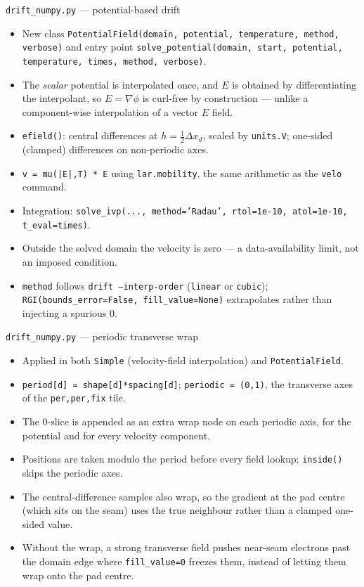 \documentclass[10pt,aspectratio=169]{beamer}
\newcommand{\ti}[1]{\texttt{\footnotesize #1}}
\begin{document}
\begin{frame}[allowframebreaks]{\texttt{drift\_numpy.py} --- potential-based drift}
  \begin{itemize}\small
  \item New class \ti{PotentialField(domain, potential, temperature, method, verbose)} and
        entry point \ti{solve\_potential(domain, start, potential, temperature, times,
        method, verbose)}.
  \item The \emph{scalar} potential is interpolated once, and $E$ is obtained by
        differentiating the interpolant, so $E=\nabla\phi$ is curl-free by construction ---
        unlike a component-wise interpolation of a vector $E$ field.
  \item \ti{efield()}: central differences at $h=\tfrac12\Delta x_d$, scaled by
        \ti{units.V}; one-sided (clamped) differences on non-periodic axes.
  \item \ti{v = mu(|E|,T) * E} using \ti{lar.mobility}, the same arithmetic as the
        \ti{velo} command.
  \item Integration: \ti{solve\_ivp(..., method='Radau', rtol=1e-10, atol=1e-10,
        t\_eval=times)}.
  \item Outside the solved domain the velocity is zero --- a data-availability limit, not an
        imposed condition.
  \item \ti{method} follows \ti{drift --interp-order} (\ti{linear} or \ti{cubic});
        \ti{RGI(bounds\_error=False, fill\_value=None)} extrapolates rather than injecting a
        spurious 0.
  \end{itemize}
\end{frame}

\begin{frame}{\texttt{drift\_numpy.py} --- periodic transverse wrap}
  \begin{itemize}\small
  \item Applied in both \ti{Simple} (velocity-field interpolation) and \ti{PotentialField}.
  \item \ti{period[d] = shape[d]*spacing[d]}; \ti{periodic = (0,1)}, the transverse axes of
        the \ti{per,per,fix} tile.
  \item The 0-slice is appended as an extra wrap node on each periodic axis, for the
        potential and for every velocity component.
  \item Positions are taken modulo the period before every field lookup; \ti{inside()}
        skips the periodic axes.
  \item The central-difference samples also wrap, so the gradient at the pad centre (which
        sits on the seam) uses the true neighbour rather than a clamped one-sided value.
  \item Without the wrap, a strong transverse field pushes near-seam electrons past the
        domain edge where \ti{fill\_value=0} freezes them, instead of letting them wrap onto
        the pad centre.
  \end{itemize}
\end{frame}
\end{document}
